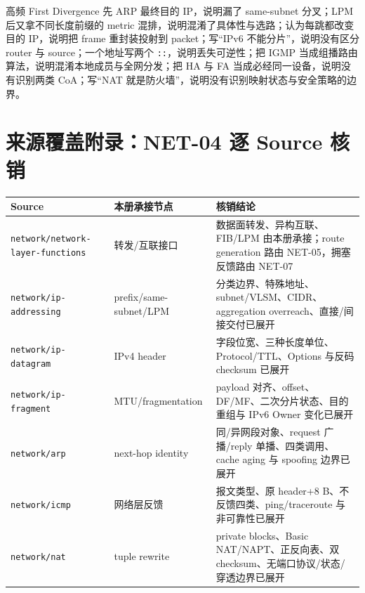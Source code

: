 \documentclass[11pt,a4paper]{ctexart}
\newcommand{\code}[1]{\texttt{#1}}
\begin{document}
\begin{warnbox}{高频 First Divergence}
先 ARP 最终目的 IP，说明漏了 same-subnet 分叉；LPM 后又拿不同长度前缀的 metric 混排，说明混淆了具体性与选路；认为每跳都改变目的 IP，说明把 frame 重封装投射到 packet；写“IPv6 不能分片”，说明没有区分 router 与 source；一个地址写两个 \code{::}，说明丢失可逆性；把 IGMP 当成组播路由算法，说明混淆本地成员与全网分发；把 HA 与 FA 当成必经同一设备，说明没有识别两类 CoA；写“NAT 就是防火墙”，说明没有识别映射状态与安全策略的边界。
\end{warnbox}

\section{来源覆盖附录：NET-04 逐 Source 核销}

\begin{center}\small
\begin{tabularx}{\linewidth}{L{4.1cm}L{3.0cm}Y}
\toprule
Source & 本册承接节点 & 核销结论\\
\midrule
\code{network/}\newline\code{network-layer-functions} & 转发/互联接口 & 数据面转发、异构互联、FIB/LPM 由本册承接；route generation 路由 NET-05，拥塞反馈路由 NET-07\\
\code{network/}\newline\code{ip-addressing} & prefix/same-subnet/LPM & 分类边界、特殊地址、subnet/VLSM、CIDR、aggregation overreach、直接/间接交付已展开\\
\code{network/}\newline\code{ip-datagram} & IPv4 header & 字段位宽、三种长度单位、Protocol/TTL、Options 与反码 checksum 已展开\\
\code{network/}\newline\code{ip-fragment} & MTU/fragmentation & payload 对齐、offset、DF/MF、二次分片状态、目的重组与 IPv6 Owner 变化已展开\\
\code{network/}\newline\code{arp} & next-hop identity & 同/异网段对象、request 广播/reply 单播、四类调用、cache aging 与 spoofing 边界已展开\\
\code{network/}\newline\code{icmp} & 网络层反馈 & 报文类型、原 header+8 B、不反馈四类、ping/traceroute 与非可靠性已展开\\
\code{network/}\newline\code{nat} & tuple rewrite & private blocks、Basic NAT/NAPT、正反向表、双 checksum、无端口协议/状态/穿透边界已展开\\

\end{tabularx}
\end{center}
\end{document}
